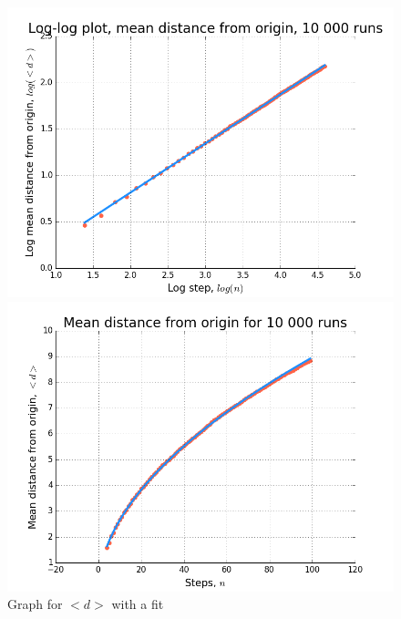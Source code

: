 \documentclass[12pt]{article}
\begin{document}
\begin{figure}[!htb]
  \includegraphics[width=\linewidth]{meanDLog.png}
  \caption{$log(<d>)\,vs\,log(n)$}\label{fig:meanDLog}
\endminipage\hfill
{}
  \includegraphics[width=\linewidth]{meanD.png}
  \caption{Graph for $<d>$ with a fit}\label{fig:meanD}
\endminipage\hfill
\end{figure}
\end{document}
